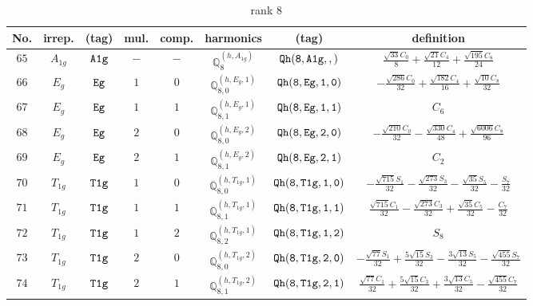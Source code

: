 \documentclass[fleqn,8pt]{jsarticle}
\begin{document}
\begin{table}[ht!]
\begin{center}
\caption{rank 8}
\renewcommand{\arraystretch}{1.3}
\begin{tabular}{cccccccc} \hline \hline
No. & irrep. & (tag) & mul. & comp. & harmonics & (tag) & definition \\ \hline
$ 65 $ & $ A_{1g} $ & $ {\tt A1g} $ & $ - $ & $ - $ & $ \mathbb{Q}_{8}^{(h,A_{1g})} $ & $ {\tt Qh(8,A1g,,)} $ & $ \frac{\sqrt{33} C_{0}}{8} + \frac{\sqrt{21} C_{4}}{12} + \frac{\sqrt{195} C_{8}}{24} $ \\
$ 66 $ & $ E_{g} $ & $ {\tt Eg} $ & $ 1 $ & $ 0 $ & $ \mathbb{Q}_{8,0}^{(h,E_{g},1)} $ & $ {\tt Qh(8,Eg,1,0)} $ & $ - \frac{\sqrt{286} C_{0}}{32} + \frac{\sqrt{182} C_{4}}{16} + \frac{\sqrt{10} C_{8}}{32} $ \\
$ 67 $ & $ E_{g} $ & $ {\tt Eg} $ & $ 1 $ & $ 1 $ & $ \mathbb{Q}_{8,1}^{(h,E_{g},1)} $ & $ {\tt Qh(8,Eg,1,1)} $ & $ C_{6} $ \\
$ 68 $ & $ E_{g} $ & $ {\tt Eg} $ & $ 2 $ & $ 0 $ & $ \mathbb{Q}_{8,0}^{(h,E_{g},2)} $ & $ {\tt Qh(8,Eg,2,0)} $ & $ - \frac{\sqrt{210} C_{0}}{32} - \frac{\sqrt{330} C_{4}}{48} + \frac{\sqrt{6006} C_{8}}{96} $ \\
$ 69 $ & $ E_{g} $ & $ {\tt Eg} $ & $ 2 $ & $ 1 $ & $ \mathbb{Q}_{8,1}^{(h,E_{g},2)} $ & $ {\tt Qh(8,Eg,2,1)} $ & $ C_{2} $ \\
$ 70 $ & $ T_{1g} $ & $ {\tt T1g} $ & $ 1 $ & $ 0 $ & $ \mathbb{Q}_{8,0}^{(h,T_{1g},1)} $ & $ {\tt Qh(8,T1g,1,0)} $ & $ - \frac{\sqrt{715} S_{1}}{32} - \frac{\sqrt{273} S_{3}}{32} - \frac{\sqrt{35} S_{5}}{32} - \frac{S_{7}}{32} $ \\
$ 71 $ & $ T_{1g} $ & $ {\tt T1g} $ & $ 1 $ & $ 1 $ & $ \mathbb{Q}_{8,1}^{(h,T_{1g},1)} $ & $ {\tt Qh(8,T1g,1,1)} $ & $ \frac{\sqrt{715} C_{1}}{32} - \frac{\sqrt{273} C_{3}}{32} + \frac{\sqrt{35} C_{5}}{32} - \frac{C_{7}}{32} $ \\
$ 72 $ & $ T_{1g} $ & $ {\tt T1g} $ & $ 1 $ & $ 2 $ & $ \mathbb{Q}_{8,2}^{(h,T_{1g},1)} $ & $ {\tt Qh(8,T1g,1,2)} $ & $ S_{8} $ \\
$ 73 $ & $ T_{1g} $ & $ {\tt T1g} $ & $ 2 $ & $ 0 $ & $ \mathbb{Q}_{8,0}^{(h,T_{1g},2)} $ & $ {\tt Qh(8,T1g,2,0)} $ & $ - \frac{\sqrt{77} S_{1}}{32} + \frac{5 \sqrt{15} S_{3}}{32} - \frac{3 \sqrt{13} S_{5}}{32} - \frac{\sqrt{455} S_{7}}{32} $ \\
$ 74 $ & $ T_{1g} $ & $ {\tt T1g} $ & $ 2 $ & $ 1 $ & $ \mathbb{Q}_{8,1}^{(h,T_{1g},2)} $ & $ {\tt Qh(8,T1g,2,1)} $ & $ \frac{\sqrt{77} C_{1}}{32} + \frac{5 \sqrt{15} C_{3}}{32} + \frac{3 \sqrt{13} C_{5}}{32} - \frac{\sqrt{455} C_{7}}{32} $ \\

\end{tabular}
\end{center}
\end{table}
\end{document}
